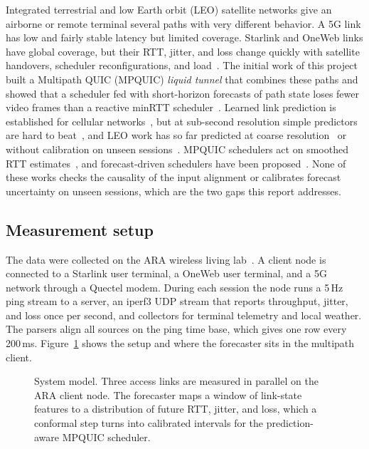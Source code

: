 Integrated terrestrial and low Earth orbit (LEO) satellite networks give an airborne or remote terminal several paths with very different behavior. A 5G link has low and fairly stable latency but limited coverage. Starlink and OneWeb links have global coverage, but their RTT, jitter, and loss change quickly with satellite handovers, scheduler reconfigurations, and load~\cite{michel2022first,mohan2024multifaceted,tanveer2023making,zhao2025measuring,perrin2025measurement}. The initial work of this project built a Multipath QUIC (MPQUIC) \emph{liquid tunnel} that combines these paths and showed that a scheduler fed with short-horizon forecasts of path state loses fewer video frames than a reactive minRTT scheduler~\cite{deconinck2017multipath}. Learned link prediction is established for cellular networks~\cite{narayanan2020lumos5g,mei2019realtime}, but at sub-second resolution simple predictors are hard to beat~\cite{basit2024predictability}, and LEO work has so far predicted at coarse resolution~\cite{liu2025vivisecting,benghe2026horizon} or without calibration on unseen sessions~\cite{chi2026reading}. MPQUIC schedulers act on smoothed RTT estimates~\cite{paasch2014experimental,lim2017ecf,baltaci2023multipath}, and forecast-driven schedulers have been proposed~\cite{yang2024mams,maglione2025intelligent}. None of these works checks the causality of the input alignment or calibrates forecast uncertainty on unseen sessions, which are the two gaps this report addresses.

\subsection{Measurement setup}
The data were collected on the ARA wireless living lab~\cite{islam2025design}. A client node is connected to a Starlink user terminal, a OneWeb user terminal, and a 5G network through a Quectel modem. During each session the node runs a 5\,Hz ping stream to a server, an iperf3 UDP stream that reports throughput, jitter, and loss once per second, and collectors for terminal telemetry and local weather. The parsers align all sources on the ping time base, which gives one row every 200\,ms. Figure~\ref{fig:system} shows the setup and where the forecaster sits in the multipath client.

\begin{figure}[htbp]
  \centering
  \resizebox{0.78\linewidth}{!}{}
  \caption{System model. Three access links are measured in parallel on the ARA client node. The forecaster maps a window of link-state features to a distribution of future RTT, jitter, and loss, which a conformal step turns into calibrated intervals for the prediction-aware MPQUIC scheduler.}
  \label{fig:system}
\end{figure}

